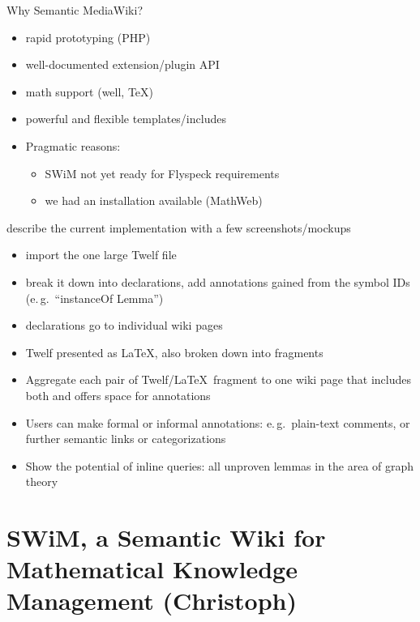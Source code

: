 \documentclass{llncs}
\begin{document}
Why Semantic MediaWiki\cite{kroetzsch06:semantic-mediawiki}?
\begin{itemize}
\item rapid prototyping (PHP)
\item well-documented extension/plugin API
\item math support (well, \TeX)
\item powerful and flexible templates/includes
\item Pragmatic reasons:
  \begin{itemize}
  \item SWiM not yet ready for Flyspeck requirements
  \item we had an installation available (MathWeb)
  \end{itemize}
\end{itemize}

\begin{todo}[Christoph]{describe the current implementation with a few
    screenshots/mockups}
  \begin{itemize}
  \item import the one large Twelf file
  \item break it down into declarations, add annotations gained from the symbol IDs
    (e.\,g.\ ``instanceOf Lemma'')
  \item declarations go to individual wiki pages
  \item Twelf presented as \LaTeX, also broken down into fragments
  \item Aggregate each pair of Twelf/\LaTeX\ fragment to one wiki page that includes both
    and offers space for annotations
  \item Users can make formal or informal annotations: e.\,g.\ plain-text comments, or
    further semantic links or categorizations
  \item Show the potential of inline queries: all unproven lemmas in the area of graph
    theory
  \end{itemize}
\end{todo}

\section{SWiM, a Semantic Wiki for Mathematical Knowledge Management (Christoph)}
\label{sec:swim}
\end{document}
